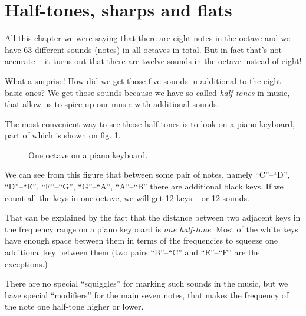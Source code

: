 \documentclass[../sparc.tex]{subfiles}
\begin{document}
\newpage
\section{Half-tones, sharps and flats}

All this chapter we were saying that there are eight notes in the octave and we
have 63 different sounds (notes) in all octaves in total.  But in fact that's
not accurate -- it turns out that there are twelve sounds in the octave instead
of eight!

What a surprise!  How did we get those five sounds in additional to the eight
basic ones?  We get those sounds because we have so called \emph{half-tones} in
music, that allow us to spice up our music with additional sounds.

The most convenient way to see those half-tones is to look on a piano keyboard,
part of which is shown on fig. \ref{fig:piano-keyboard}.

\begin{figure}[H]
  \centering
  \label{fig:piano-keyboard}
  \caption{One octave on a piano keyboard.}
\end{figure}

We can see from this figure that between some pair of notes, namely ``C''--``D'',
``D''--``E'', ``F''--``G'', ``G''--``A'', ``A''--``B'' there are additional black
keys.  If we count all the keys in one octave, we will get 12 keys -- or 12
sounds.

That can be explained by the fact that the distance between two adjacent keys in
the frequency range on a piano keyboard is \emph{one half-tone}.  Most of the
white keys have enough space between them in terms of the frequencies to squeeze
one additional key between them (two pairs ``B''--``C'' and ``E''--``F'' are the
exceptions.)

There are no special ``squiggles'' for marking such sounds in the music, but we
have special ``modifiers'' for the main seven notes, that makes the frequency of
the note one half-tone higher or lower.
\end{document}
